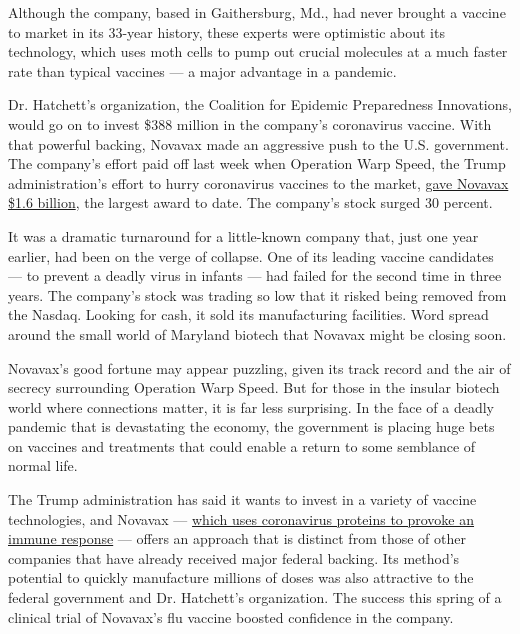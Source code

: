 Although the company, based in Gaithersburg, Md., had never brought a
vaccine to market in its 33-year history, these experts were optimistic
about its technology, which uses moth cells to pump out crucial
molecules at a much faster rate than typical vaccines --- a major
advantage in a pandemic.

Dr. Hatchett's organization, the Coalition for Epidemic Preparedness
Innovations, would go on to invest \$388 million in the company's
coronavirus vaccine. With that powerful backing, Novavax made an
aggressive push to the U.S. government. The company's effort paid off
last week when Operation Warp Speed, the Trump administration's effort
to hurry coronavirus vaccines to the market,
\href{https://www.nytimes.com/2020/07/07/health/novavax-coronavirus-vaccine-warp-speed.html}{gave
Novavax \$1.6 billion}, the largest award to date. The company's stock
surged 30 percent.

It was a dramatic turnaround for a little-known company that, just one
year earlier, had been on the verge of collapse. One of its leading
vaccine candidates --- to prevent a deadly virus in infants --- had
failed for the second time in three years. The company's stock was
trading so low that it risked being removed from the Nasdaq. Looking for
cash, it sold its manufacturing facilities. Word spread around the small
world of Maryland biotech that Novavax might be closing soon.

Novavax's good fortune may appear puzzling, given its track record and
the air of secrecy surrounding Operation Warp Speed. But for those in
the insular biotech world where connections matter, it is far less
surprising. In the face of a deadly pandemic that is devastating the
economy, the government is placing huge bets on vaccines and treatments
that could enable a return to some semblance of normal life.

The Trump administration has said it wants to invest in a variety of
vaccine technologies, and Novavax ---
\href{https://www.nytimes.com/interactive/2020/05/20/science/coronavirus-vaccine-development.html}{which
uses coronavirus proteins to provoke an immune response} --- offers an
approach that is distinct from those of other companies that have
already received major federal backing. Its method's potential to
quickly manufacture millions of doses was also attractive to the federal
government and Dr. Hatchett's organization. The success this spring of a
clinical trial of Novavax's flu vaccine boosted confidence in the
company.

